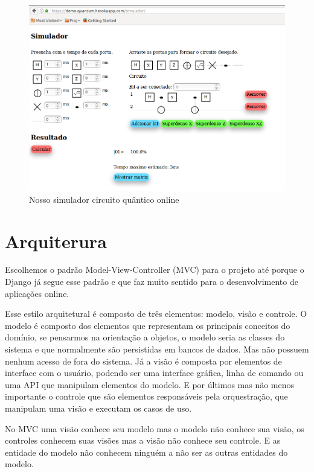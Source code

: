 \documentclass[a4paper, 12pt, oneside]{book}
\begin{document}
\begin{figure}[H]
\centering
\includegraphics[scale=0.4]{simulador-pagina.png}
\caption{Nosso simulador circuito quântico online}
\end{figure}

\section{Arquiterura}

Escolhemos o padrão Model-View-Controller (MVC) para o projeto até porque o Django já segue esse padrão e que faz muito sentido para o desenvolvimento de aplicações online.

Esse estilo arquitetural é composto de três elementos: modelo, visão e controle. O modelo é composto dos elementos que representam os principais conceitos do domínio, se pensarmos na orientação a objetos, o modelo seria as classes do sistema e que normalmente são persistidas em bancos de dados. Mas não possuem nenhum acesso de fora do sistema. Já a visão é composta por elementos de interface com o usuário, podendo ser uma interface gráfica, linha de comando ou uma API que manipulam elementos do modelo. E por últimos mas não menos importante o controle que são elementos responsáveis pela orquestração, que manipulam uma visão e executam os casos de uso.

No MVC uma visão conhece seu modelo mas o modelo não conhece sua visão, os controles conhecem suas visões mas a visão não conhece seu controle. E as entidade do modelo não conhecem ninguém a não ser as outras entidades do modelo.
\end{document}
